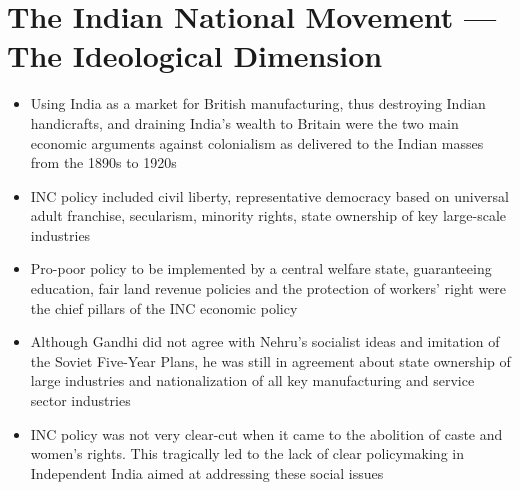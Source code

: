 \section{The Indian National Movement — The Ideological Dimension}
\begin{itemize}
    \item Using India as a market for British manufacturing, thus destroying Indian handicrafts, and draining India's wealth to Britain were the two main economic arguments against colonialism as delivered to the Indian masses from the 1890s to 1920s
    \item INC policy included civil liberty, representative democracy based on universal adult franchise, secularism, minority rights, state ownership of key large-scale industries
    \item Pro-poor policy to be implemented by a central welfare state, guaranteeing education, fair land revenue policies and the protection of workers' right were the chief pillars of the INC economic policy
    \item Although Gandhi did not agree with Nehru's socialist ideas and imitation of the Soviet Five-Year Plans, he was still in agreement about state ownership of large industries and nationalization of all key manufacturing and service sector industries
    \item INC policy was not very clear-cut when it came to the abolition of caste and women's rights. This tragically led to the lack of clear policymaking in Independent India aimed at addressing these social issues
\end{itemize}